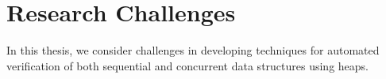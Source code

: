 \section*{Research Challenges}
%
In this thesis, we consider challenges in developing techniques for automated verification of both sequential and concurrent data structures using heaps. 
